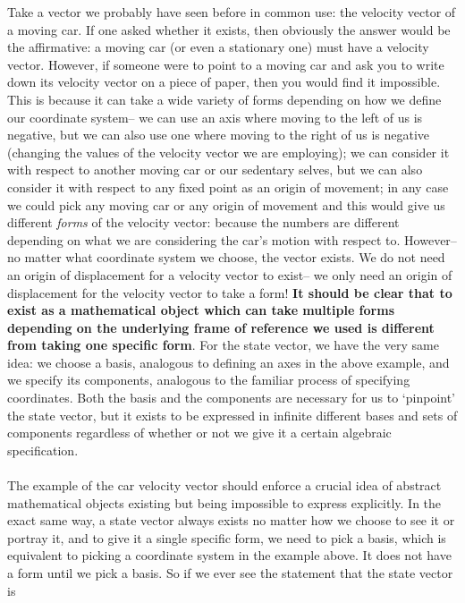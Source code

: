Take a vector we probably have seen before in common use: the velocity vector of a moving car. If one asked whether it exists, then obviously the answer would be the affirmative: a moving car (or even a stationary one) must have a velocity vector. However, if someone were to point to a moving car and ask you to write down its velocity vector on a piece of paper, then you would find it impossible. This is because it can take a wide variety of forms depending on how we define our coordinate system-- we can use an axis where moving to the left of us is negative, but we can also use one where moving to the right of us is negative (changing the values of the velocity vector we are employing); we can consider it with respect to another moving car or our sedentary selves, but we can also consider it with respect to any fixed point as an origin of movement; in any case we could pick any moving car or any origin of movement and this would give us different \textit{forms} of the velocity vector: because the numbers are different depending on what we are considering the car's motion with respect to. However-- no matter what coordinate system we choose, the vector exists. We do not need an origin of displacement for a velocity vector to exist-- we only need an origin of displacement for the velocity vector to take a form! \textbf{It should be clear that to exist as a mathematical object which can take multiple forms depending on the underlying frame of reference we used is different from taking one specific form}. For the state vector, we have the very same idea: we choose a basis, analogous to defining an axes in the above example, and we specify its components, analogous to the familiar process of specifying coordinates. Both the basis and the components are necessary for us to `pinpoint' the state vector, but it exists to be expressed in infinite different bases and sets of components regardless of whether or not we give it a certain algebraic specification.  %
\\\\
The example of the car velocity vector should enforce a crucial idea of abstract mathematical objects existing but being impossible to express explicitly. In the exact same way, a state vector always exists no matter how we choose to see it or portray it, and to give it a single specific form, we need to pick a basis, which is equivalent to picking a coordinate system in the example above. It does not have a form until we pick a basis. So if we ever see the statement that the state vector is 
